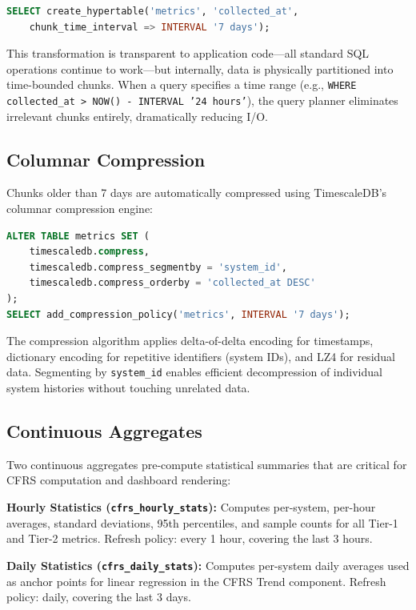 \documentclass{ieeeaccess}
\begin{document}
\begin{lstlisting}[language=SQL]
SELECT create_hypertable('metrics', 'collected_at',
    chunk_time_interval => INTERVAL '7 days');
\end{lstlisting}

This transformation is transparent to application code---all standard SQL operations continue to work---but internally, data is physically partitioned into time-bounded chunks. When a query specifies a time range (e.g., \texttt{WHERE collected\_at > NOW() - INTERVAL '24 hours'}), the query planner eliminates irrelevant chunks entirely, dramatically reducing I/O.

\subsection{Columnar Compression}
Chunks older than 7 days are automatically compressed using TimescaleDB's columnar compression engine:

\begin{lstlisting}[language=SQL]
ALTER TABLE metrics SET (
    timescaledb.compress,
    timescaledb.compress_segmentby = 'system_id',
    timescaledb.compress_orderby = 'collected_at DESC'
);
SELECT add_compression_policy('metrics', INTERVAL '7 days');
\end{lstlisting}

The compression algorithm applies delta-of-delta encoding for timestamps, dictionary encoding for repetitive identifiers (system IDs), and LZ4 for residual data. Segmenting by \texttt{system\_id} enables efficient decompression of individual system histories without touching unrelated data.

\subsection{Continuous Aggregates}
Two continuous aggregates pre-compute statistical summaries that are critical for CFRS computation and dashboard rendering:

\textbf{Hourly Statistics (\texttt{cfrs\_hourly\_stats}):} Computes per-system, per-hour averages, standard deviations, 95th percentiles, and sample counts for all Tier-1 and Tier-2 metrics. Refresh policy: every 1 hour, covering the last 3 hours.

\textbf{Daily Statistics (\texttt{cfrs\_daily\_stats}):} Computes per-system daily averages used as anchor points for linear regression in the CFRS Trend component. Refresh policy: daily, covering the last 3 days.
\end{document}

